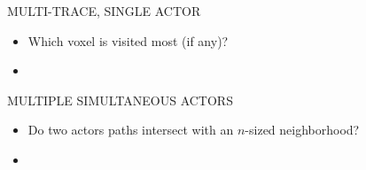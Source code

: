 \documentclass{article}
\begin{document}
MULTI-TRACE, SINGLE ACTOR\\
\begin{itemize}
  \item Which voxel is visited most (if any)?
  \item 
\end{itemize}

MULTIPLE SIMULTANEOUS ACTORS\\
\begin{itemize}
  \item Do two actors paths intersect with an $n$-sized neighborhood?
  \item 
\end{itemize}

\end{document}
